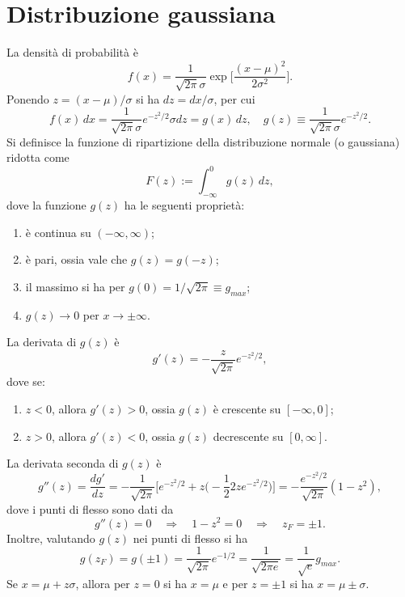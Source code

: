 \documentclass{article}
\theoremstyle{remark}
\begin{document}
\section{Distribuzione gaussiana}
La densità di probabilità è
\begin{equation}
    f(x) = \frac{1}{\sqrt{2\pi}\sigma}\exp{\bigg[\frac{(x - \mu)^2}{2\sigma^2}\bigg]}.
\end{equation}
Ponendo $z = (x - \mu)/\sigma$ si ha $dz = dx/\sigma$, per cui
\begin{equation}
    f(x)\,dx = \frac{1}{\sqrt{2\pi}\sigma}e^{-z^2/2}\sigma dz = g(x)\,dz,\quad g(z) \equiv \frac{1}{\sqrt{2\pi}\sigma}e^{-z^2/2}.
\end{equation}
Si definisce la funzione di ripartizione della distribuzione normale (o gaussiana) ridotta come
\begin{equation}
    F(z) := \int_{-\infty}^0 g(z)\,dz,
\end{equation}
dove la funzione $g(z)$ ha le seguenti proprietà:
\begin{enumerate}
    \item è continua su $(-\infty,\infty)$;
    \item è pari, ossia vale che $g(z) = g(-z)$;
    \item il massimo si ha per $g(0) = 1/\sqrt{2\pi} \equiv g_{max}$;
    \item $g(z) \to 0$ per $x \to \pm\infty$.
\end{enumerate}
La derivata di $g(z)$ è
\begin{equation}
    g'(z) = -\frac{z}{\sqrt{2\pi}}e^{-z^2/2},
\end{equation}
dove se:
\begin{enumerate}
    \item $z < 0$, allora $g'(z) > 0$, ossia $g(z)$ è crescente su $[-\infty,0]$;
    \item $z > 0$, allora $g'(z) < 0$, ossia $g(z)$ decrescente su $[0,\infty]$.
\end{enumerate}
La derivata seconda di $g(z)$ è
\begin{equation}
    g''(z) = \frac{dg'}{dz} = -\frac{1}{\sqrt{2\pi}}\bigg[e^{-z^2/2} + z\bigg(-\frac{1}{2}2ze^{-z^2/2}\bigg)\bigg] = -\frac{e^{-z^2/2}}{\sqrt{2\pi}}(1 - z^2),
\end{equation}
dove i punti di flesso sono dati da 
\begin{equation}
    g''(z) = 0 \quad \Longrightarrow \quad 1 - z^2 = 0 \quad \Longrightarrow \quad z_{F} = \pm 1.
\end{equation}
Inoltre, valutando $g(z)$ nei punti di flesso si ha
\begin{equation}
    g(z_{F}) = g(\pm 1) = \frac{1}{\sqrt{2\pi}}e^{-1/2} = \frac{1}{\sqrt{2\pi e}} = \frac{1}{\sqrt{e}}g_{max}.
\end{equation}
Se $x = \mu + z\sigma$, allora per $z = 0$ si ha $x = \mu$ e per $z = \pm 1$ si ha $x = \mu \pm \sigma$. 
\end{document}
